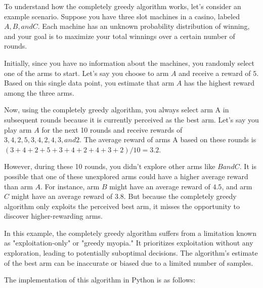 \documentclass{article}
\begin{document}
To understand how the completely greedy algorithm works, let's consider an example scenario. Suppose you have three slot machines in a casino, labeled $A, B, and C$. Each machine has an unknown probability distribution of winning, and your goal is to maximize your total winnings over a certain number of rounds.

Initially, since you have no information about the machines, you randomly select one of the arms to start. Let's say you choose to arm $A$ and receive a reward of $5$. Based on this single data point, you estimate that arm $A$ has the highest reward among the three arms.

Now, using the completely greedy algorithm, you always select arm A in subsequent rounds because it is currently perceived as the best arm. Let's say you play arm $A$ for the next 10 rounds and receive rewards of $3, 4, 2, 5, 3, 4, 2, 4, 3, and 2$. The average reward of arms A based on these rounds is $(3+4+2+5+3+4+2+4+3+2)/10 = 3.2$.

However, during these 10 rounds, you didn't explore other arms like $B and C$. It is possible that one of these unexplored arms could have a higher average reward than arm $A$. For instance, arm $B$ might have an average reward of $4.5$, and arm $C$ might have an average reward of $3.8$. But because the completely greedy algorithm only exploits the perceived best arm, it misses the opportunity to discover higher-rewarding arms.

In this example, the completely greedy algorithm suffers from a limitation known as "exploitation-only" or "greedy myopia." It prioritizes exploitation without any exploration, leading to potentially suboptimal decisions. The algorithm's estimate of the best arm can be inaccurate or biased due to a limited number of samples.

The implementation of this algorithm in Python is as follows:
\end{document}
